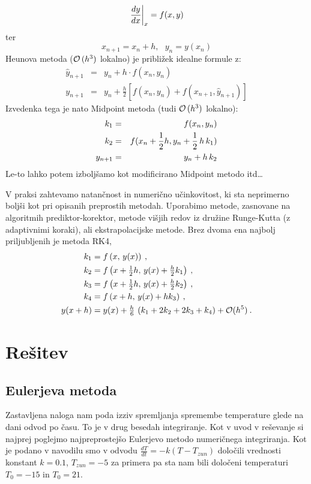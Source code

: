 \documentclass{article}
\begin{document}
$$ \left.{dy \over dx}\right|_x = f(x,y) $$ ter $$ x_{n+1} = x_n + h,
~~~ y_n = y(x_n)$$
Heunova metoda (${\cal O}\,(h^3 )$ lokalno) je pribli\v zek idealne formule z:
\begin{eqnarray}
\hat{y}_{n+1} & =  & y_n +  h \cdot f(x_n,y_n) \\
y_{n+1} & = & y_n + \frac{h}{2} \left[ f(x_n,y_n) + f(x_{n+1},\hat{y}_{n+1})\right]
\end{eqnarray}
Izvedenka tega je nato Midpoint metoda  (tudi ${\cal O}\,(h^3 )$ lokalno):
\begin{eqnarray}
k_1 & = & f(x_n,y_n) \\
k_2 & = & f(x_n+{1 \over 2}h,y_n+{1 \over 2}\, h\,k_1) \\
y_{n+1} & = & y_n + h\,k_2
\end{eqnarray}
Le-to lahko potem izbolj\v samo kot modificirano Midpoint metodo
itd\ldots

V praksi zahtevamo natančnost in numerično učinkovitost,
ki sta neprimerno boljši kot pri opisanih preprostih metodah.
Uporabimo metode, zasnovane na algoritmih prediktor-korektor,
metode višjih redov iz družine Runge-Kutta (z adaptivnimi koraki), ali ekstrapolacijske metode.
Brez dvoma ena najbolj priljubljenih je metoda RK4,
\begin{align}
k_1 & =
  f\left(x,\,{y}(x)\right) \> {,}\nonumber\\
k_2 & =
  f\left(x+{\textstyle{1\over 2}}h,\,
       {y}(x)+{\textstyle{h\over 2}}k_1\right) \> {,}\nonumber\\
k_3 & =
  f\left(x+{\textstyle{1\over 2}}h,\,
       {y}(x)+{\textstyle{h\over 2}}k_2\right) \> {,}\label{eq:rk4}\\
k_4 & =  f\left(x+h,\,{y}(x)+hk_3\right) \> {,}\nonumber\\
{y}(x+h) & =  {y}(x)
  + {\tfrac{h}{6}}\,\left(k_1 + 2k_2 + 2k_3 + k_4\right) + {\cal O}(h^5)
  \nonumber\> {.}
\end{align}
\section{Rešitev}
\subsection{Eulerjeva metoda}
Zastavljena naloga nam poda izziv spremljanja spremembe temperature glede na dani odvod po času. To je v drug besedah integriranje. Kot v uvod v reševanje si najprej poglejmo najpreprostejšo Eulerjevo metodo numeričnega integriranja. Kot je podano v navodilu smo v odvodu $\frac{dT}{dt} = -k(T -T_{zun})$ določili vrednosti konstant $k=0.1$, $T_{zun}=-5$ za primera pa sta nam bili določeni temperaturi $T_0 = -15$ in $T_0=21$.
\end{document}
